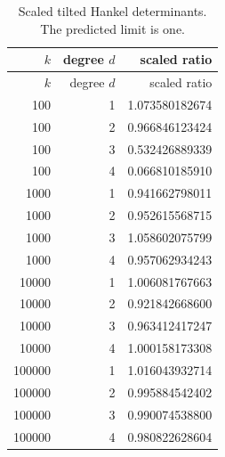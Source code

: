 \begin{longtable}{rrr}
\caption{Scaled tilted Hankel determinants. The predicted limit is one.}\label{tab:hankel}\\
\toprule
$k$ & degree $d$ & scaled ratio\\
\midrule
\endfirsthead
\toprule
$k$ & degree $d$ & scaled ratio\\
\midrule
\endhead
100 & 1 & 1.073580182674 \\
100 & 2 & 0.966846123424 \\
100 & 3 & 0.532426889339 \\
100 & 4 & 0.066810185910 \\
1000 & 1 & 0.941662798011 \\
1000 & 2 & 0.952615568715 \\
1000 & 3 & 1.058602075799 \\
1000 & 4 & 0.957062934243 \\
10000 & 1 & 1.006081767663 \\
10000 & 2 & 0.921842668600 \\
10000 & 3 & 0.963412417247 \\
10000 & 4 & 1.000158173308 \\
100000 & 1 & 1.016043932714 \\
100000 & 2 & 0.995884542402 \\
100000 & 3 & 0.990074538800 \\
100000 & 4 & 0.980822628604 \\
\bottomrule
\end{longtable}
